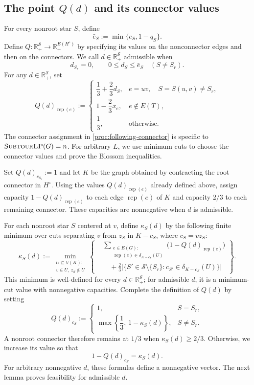 \documentclass[11pt]{amsart}
\DeclareMathOperator{\R}{\mathbb{R}}
\newcommand{\rep}[1]{\operatorname{rep}(#1)}
\def\R{{\mathbb R}}
\newcommand{\1}{\mathbbm{1}}
\newcommand{\SubtourLP}{\textsc{SubtourLP}}
\begin{document}
\subsection{The point \texorpdfstring{${Q(d)}$}{Q(d)} and its connector values}

For every nonroot star $S$, define
\[
 \bar e_S:=\min\{e_S,1-q_S\}.
\]
{
Define $Q:\R_+^{\mathcal S}\to\R_+^{E(H^\circ)}$ by specifying
its values on the nonconnector edges and then on the connectors.
We call $d\in\R_+^{\mathcal S}$ admissible when
\[
 d_{S_r}=0,\qquad 0\le d_S\le\bar e_S\quad(S\ne S_r).
\]
For any $d\in\R_+^{\mathcal S}$, set
}
\[
 {Q(d)}_{\rep{e}}:=
 \begin{cases}
 \dfrac13+\dfrac23d_S,
   &e=uv,\quad S=S(u,v)\ne S_r,\\[5pt]
 1-\dfrac23x_e,&e\notin E(T),\\[5pt]
 \dfrac13,&\text{otherwise}.
 \end{cases}
\]
{The connector assignment in
\eqref{proc:following-connector} is specific to $\SubtourLP(G)=n$.
For arbitrary $L$, we use minimum cuts to choose the connector
values and prove the Blossom inequalities.}

Set ${Q(d)}_{c_{S_r}}:=1$ and let $K$ be the graph obtained
by contracting the root connector in $H^\circ$.
{
Using the values $Q(d)_{\rep{e}}$ already defined above,
assign capacity $1-Q(d)_{\rep{e}}$ to each edge $\rep{e}$
of $K$ and capacity $2/3$ to each remaining connector.
These capacities are nonnegative when $d$ is admissible.}

{For each nonroot star $S$ centered at $v$, define $\kappa_S(d)$
by the following finite minimum over cuts separating $v$ from $z_S$
in $K-c_S$, where $c_S=vz_S$:
}
\begin{equation}\label{s12pair:mincut-completion}
 \kappa_S(d):=
 \min_{\substack{U\subseteq V(K):\\v\in U,\ z_S\notin U}}
 \left\{
 \begin{aligned}
 &\sum_{\substack{e\in E(G):\\
                  \rep{e}\in\delta_{K-c_S}(U)}}
       \bigl(1-{Q(d)}_{\rep{e}}\bigr)\\[-2pt]
 &\quad+\frac23
 \bigl|\{S'\in\mathcal S\setminus\{S_r\}:
             c_{S'}\in\delta_{K-c_S}(U)\}\bigr|
 \end{aligned}
 \right\}.
\end{equation}
{
This minimum is well-defined for every $d\in\R_+^{\mathcal S}$;
for admissible $d$, it is a minimum-cut value with nonnegative capacities.
Complete the definition of $Q(d)$ by setting
}
\[
 {Q(d)}_{c_S}:=
 \begin{cases}
  1,&S=S_r,\\[3pt]
  \max\left\{\dfrac13,\,1-\kappa_S(d)\right\},&S\ne S_r.
 \end{cases}
\]
A nonroot connector therefore remains at $1/3$ when
$\kappa_S(d)\ge2/3$. Otherwise, we increase its value so that
\[
 1-{Q(d)}_{c_S}=\kappa_S(d).
\]
{
For arbitrary nonnegative $d$, these formulas define a nonnegative
vector. The next lemma proves feasibility for admissible $d$.
}
\end{document}
